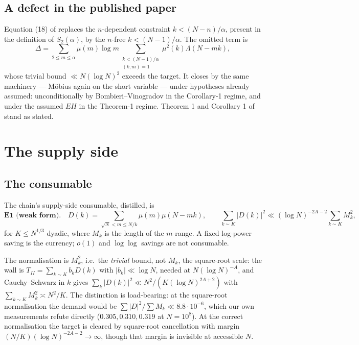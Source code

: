 \documentclass[11pt,a4paper]{article}
\theoremstyle{plain}
\theoremstyle{definition}
\begin{document}
\subsection{A defect in the published paper}

Equation (18) of \cite{HL} replaces the $n$-dependent constraint
$k < (N-n)/\alpha$, present in the definition of $S_2(\alpha)$, by the
$n$-free $k < (N-1)/\alpha$. The omitted term is
\[
  \Delta = \sum_{2\le m\le\alpha}\mu(m)\log m
    \sum_{\substack{k<(N-1)/\alpha\\ (k,m)=1}}\mu^2(k)\Lambda(N-mk),
\]
whose trivial bound $\ll N(\log N)^2$ exceeds the target. It closes by
the same machinery --- M\"obius again on the short variable --- under
hypotheses already assumed: unconditionally by Bombieri--Vinogradov in
the Corollary-1 regime, and under the assumed $EH$ in the Theorem-1
regime. Theorem 1 and Corollary 1 of \cite{HL} stand as stated.

\section{The supply side}\label{sec:supply}

\subsection{The consumable}

The chain's supply-side consumable, distilled, is
\[
  \textbf{E1 (weak form).}\quad
  D(k) = \!\!\sum_{\sqrt N < m \le N/k}\!\! \mu(m)\mu(N-mk),
  \qquad
  \sum_{k\sim K}|D(k)|^2 \ll (\log N)^{-2A-2}\sum_{k\sim K} M_k^2,
\]
for $K \le N^{1/3}$ dyadic, where $M_k$ is the length of the $m$-range.
A fixed log-power saving is the currency; $o(1)$ and $\log\log$ savings
are not consumable.

The normalisation is $M_k^2$, i.e.\ the \emph{trivial} bound, not
$M_k$, the square-root scale: the wall is
$T_{II} = \sum_{k\sim K}b_kD(k)$ with $|b_k|\ll\log N$, needed at
$N(\log N)^{-A}$, and Cauchy--Schwarz in $k$ gives
$\sum_k|D(k)|^2 \ll N^2/(K(\log N)^{2A+2})$ with
$\sum_{k\sim K}M_k^2 \asymp N^2/K$. The distinction is load-bearing:
at the square-root normalisation the demand would be
$\sum|D|^2/\sum M_k \ll 8.8\cdot10^{-6}$, which our own measurements
refute directly ($0.305, 0.310, 0.319$ at $N=10^8$). At the correct
normalisation the target is cleared by square-root cancellation with
margin $(N/K)(\log N)^{-2A-2}\to\infty$, though that margin is
invisible at accessible $N$.
\end{document}
